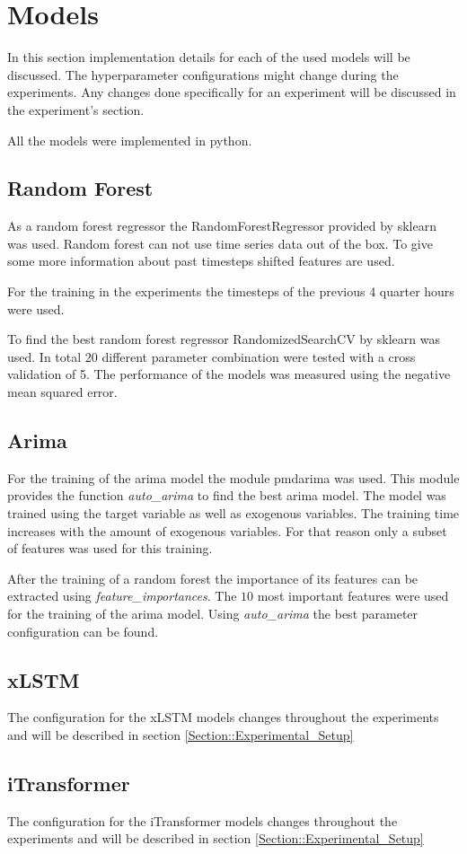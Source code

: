 \documentclass[class=scrbook, crop=false]{standalone}
\begin{document}
\section{Models}
\label{Section::Models}

In this section implementation details for each of the used models will be discussed. 
The hyperparameter configurations might change during the experiments. 
Any changes done specifically for an experiment will be discussed in the experiment's section.

All the models were implemented in python. 

\subsection{Random Forest}
\label{Section::Random_Forest}

As a random forest regressor the RandomForestRegressor provided by sklearn was used.
Random forest can not use time series data out of the box.
To give some more information about past timesteps shifted features are used.

For the training in the experiments the timesteps of the previous 4 quarter hours were used.

To find the best random forest regressor RandomizedSearchCV by sklearn was used.
In total 20 different parameter combination were tested with a cross validation of 5.
The performance of the models was measured using the negative mean squared error.

\subsection{Arima}
\label{Section::Arima}

For the training of the arima model the module pmdarima was used.
This module provides the function \textit{auto\_arima} to find the best arima model.
The model was trained using the target variable as well as exogenous variables.
The training time increases with the amount of exogenous variables.
For that reason only a subset of features was used for this training.

After the training of a random forest the importance of its features can be extracted using \textit{feature\_importances}. 
The $10$ most important features were used for the training of the arima model.
Using \textit{auto\_arima} the best parameter configuration can be found.

\subsection{xLSTM}
\label{Section::xLSTM}
The configuration for the xLSTM models changes throughout the experiments and will be described in section \ref{Section::Experimental_Setup}

\subsection{iTransformer}
\label{Section::iTransformer}
The configuration for the iTransformer models changes throughout the experiments and will be described in section \ref{Section::Experimental_Setup}
\end{document}
